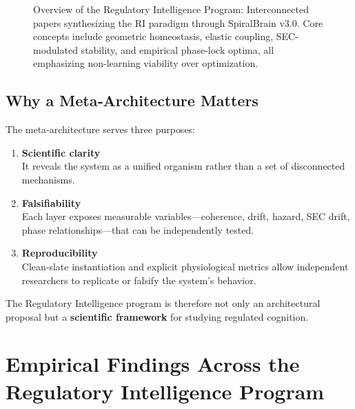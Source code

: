 \documentclass[12pt,a4paper]{report}
\begin{document}
\begin{figure}[p]
  \caption{Overview of the Regulatory Intelligence Program: Interconnected papers synthesizing the RI paradigm through SpiralBrain v3.0. Core concepts include geometric homeostasis, elastic coupling, SEC-modulated stability, and empirical phase-lock optima, all emphasizing non-learning viability over optimization.}
  \label{fig:ri-program-overview}
\end{figure}

\subsection{Why a Meta‑Architecture Matters}

The meta‑architecture serves three purposes:

\begin{enumerate}
\item \textbf{Scientific clarity} \\
  It reveals the system as a unified organism rather than a set of disconnected mechanisms.

\item \textbf{Falsifiability} \\
  Each layer exposes measurable variables—coherence, drift, hazard, SEC drift, phase relationships—that can be independently tested.

\item \textbf{Reproducibility} \\
  Clean‑slate instantiation and explicit physiological metrics allow independent researchers to replicate or falsify the system’s behavior.
\end{enumerate}

The Regulatory Intelligence program is therefore not only an architectural proposal but a \textbf{scientific framework} for studying regulated cognition.

\section{Empirical Findings Across the Regulatory Intelligence Program}
\end{document}

